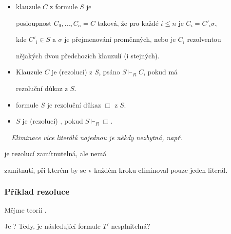     \begin{itemize}
    \item {} klauzule $C$ z formule $S$ je 
    \smallskip
    
    posloupnost $C_0,\dots,C_n=C$ taková, že pro každé $i\le n$ je $C_i=C'_i\sigma$,
    \smallskip
    
    kde $C'_i\in S$ a $\sigma$ je přejmenování proměnných, nebo je $C_i$ rezolventou
    \smallskip
    
    nějakých dvou předchozích klauzulí (i stejných).
    \smallskip
    
    \item Klauzule $C$ je (rezolucí)   z $S$, psáno $S \vdash_R C$, pokud má
    \smallskip
    
    rezoluční důkaz z $S$.
    \smallskip
    
    \item {} formule $S$ je rezoluční důkaz $\Box$ z $S$.
    \smallskip
    
    \item $S$ je (rezolucí) , pokud $S \vdash_R \Box$.
    \end{itemize}
    \medskip
    
    {\it {}\ \  Eliminace více literálů najednou je někdy nezbytná, např.
    \smallskip
    
     je rezolucí zamítnutelná, ale nemá
    \smallskip
    
    zamítnutí, při kterém by se v každém kroku eliminoval pouze jeden literál.}
    
    
    
    \subsubsection*{Příklad rezoluce}
    Mějme teorii .
    \medskip
    
    Je ? Tedy, je následující formule $T'$ nesplnitelná?
    \vspace{-1mm}
    
